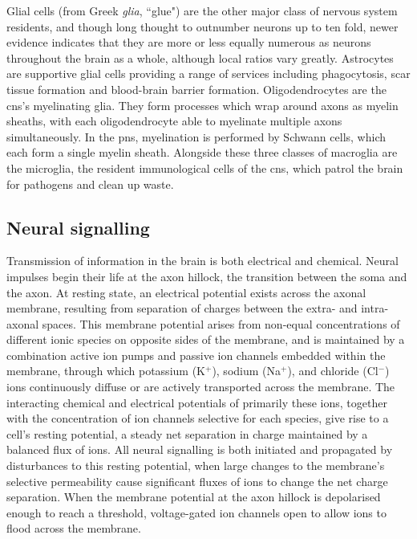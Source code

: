 Glial cells (from Greek \textit{glia}, ``glue") are the other major class of nervous system residents, and though long thought to outnumber neurons up to ten fold, newer evidence indicates that they are more or less equally numerous as neurons throughout the brain as a whole, although local ratios vary greatly.\autocite{Herculano-Houzel2014}
Astrocytes are supportive glial cells providing a range of services including phagocytosis, scar tissue formation and blood-brain barrier formation.
Oligodendrocytes are the \gls{cns}'s myelinating glia.
They form processes which wrap around axons as myelin sheaths, with each oligodendrocyte able to myelinate multiple axons simultaneously.
In the \gls{pns}, myelination is performed by Schwann cells, which each form a single myelin sheath.
Alongside these three classes of macroglia are the microglia, the resident immunological cells of the \gls{cns}, which patrol the brain for pathogens and clean up waste.

\subsection{Neural signalling}

Transmission of information in the brain is both electrical and chemical.
Neural impulses begin their life at the axon hillock, the transition between the soma and the axon.
At resting state, an electrical potential exists across the axonal membrane, resulting from separation of charges between the extra- and intra-axonal spaces.
This membrane potential arises from non-equal concentrations of different ionic species on opposite sides of the membrane, and is maintained by a combination active ion pumps and passive ion channels embedded within the membrane, through which potassium (K$^+$), sodium (Na$^+$), and chloride (Cl$^-$) ions continuously diffuse or are actively transported across the membrane.
The interacting chemical and electrical potentials of primarily these ions, together with the concentration of ion channels selective for each species, give rise to a cell's resting potential, a steady net separation in charge maintained by a balanced flux of ions.
All neural signalling is both initiated and propagated by disturbances to this resting potential, when large changes to the membrane's selective permeability cause significant fluxes of ions to change the net charge separation.
When the membrane potential at the axon hillock is depolarised enough to reach a threshold, voltage-gated ion channels open to allow ions to flood across the membrane.

